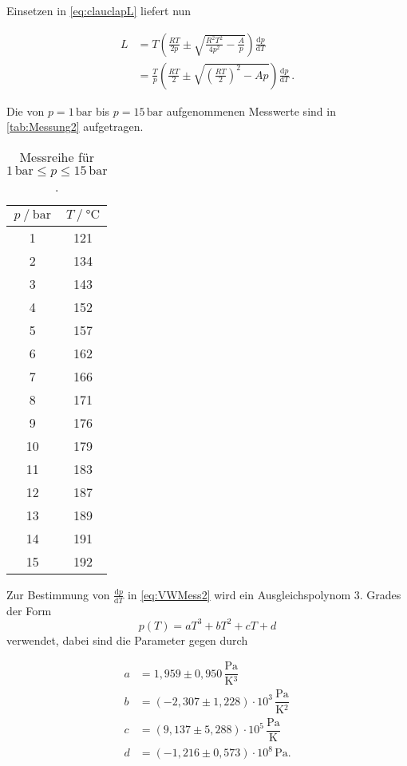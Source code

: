 Einsetzen in \eqref{eq:clauclapL} liefert nun

\begin{align}
  \nonumber
  L &= T \left(\frac{RT}{2p} \pm \sqrt{\frac{R^2 T^2}{4 p^2} - \frac{A}{p}} \right) 
  \frac{\mathrm{d}p}{\mathrm{d}T} \\
    &= \frac{T}{p} \left(\frac{RT}{2} \pm \sqrt{\left(\frac{R T}{2} \right)^2 - A p}\right) 
    \frac{\mathrm{d}p}{\mathrm{d}T} \,. 
    \label{eq:VWMess2}
\end{align}

\newpage

Die von $p = 1 \,\unit{\bar}$ bis $p = 15 \,\unit{\bar}$ aufgenommenen Messwerte sind in 
\autoref{tab:Messung2} aufgetragen.

\begin{table}[H]
  \centering
  \caption{Messreihe für  $1 \,\unit{\bar} \leq p \leq 15 \,\unit{\bar} $.}
  \label{tab:Messung2}
  \begin{tabular}{S S}
    \toprule
    {$p \mathbin{/} \unit{\bar}$} & {$T \mathbin{/} \unit{\celsius}$} \\
     & 121 \\
     2 & 134 \\
     3 & 143 \\
     4 & 152 \\
     5 & 157 \\
     6 & 162 \\
     7 & 166 \\
     8 & 171 \\
     9 & 176 \\
    10 & 179 \\
    11 & 183 \\
    12 & 187 \\
    13 & 189 \\
    14 & 191 \\
    15 & 192 \\
    \bottomrule
  \end{tabular}
\end{table}

Zur Bestimmung von $\frac{\mathrm{d}p}{\mathrm{d}T}$ in \eqref{eq:VWMess2} wird ein Ausgleichspolynom
3. Grades der Form
\begin{equation*}
  p(T) = a T^3 + b T^2 + c T + d
\end{equation*} verwendet, dabei sind die Parameter gegen durch

\begin{align*}
  a & =   1,959   \pm 0,950                  \,\dfrac{\unit{\pascal}}{\unit{\kelvin^3}}  \\
  b & = (-2,307   \pm 1,228)  \cdot 10^3     \,\dfrac{\unit{\pascal}}{\unit{\kelvin^2}}  \\
  c & =  (9,137   \pm 5,288)  \cdot 10^5     \,\dfrac{\unit{\pascal}}{\unit{\kelvin}}    \\
  d & = (-1,216   \pm 0,573)  \cdot 10^8     \,\unit{\pascal}.
\end{align*}




